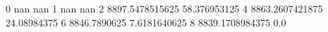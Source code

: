0 nan nan
1 nan nan
2 8897.5478515625 58.376953125
4 8863.2607421875 24.08984375
6 8846.7890625 7.6181640625
8 8839.1708984375 0.0
